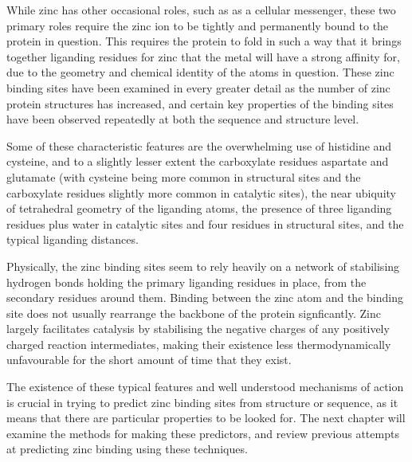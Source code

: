 While zinc has other occasional roles, such as as a cellular messenger, these two primary roles require the zinc ion to be tightly and permanently bound to the protein in question. This requires the protein to fold in such a way that it brings together liganding residues for zinc that the metal will have a strong affinity for, due to the geometry and chemical identity of the atoms in question. These zinc binding sites have been examined in every greater detail as the number of zinc protein structures has increased, and certain key properties of the binding sites have been observed repeatedly at both the sequence and structure level.

Some of these characteristic features are the overwhelming use of histidine and cysteine, and to a slightly lesser extent the carboxylate residues aspartate and glutamate (with cysteine being more common in structural sites and the carboxylate residues slightly more common in catalytic sites), the near ubiquity of tetrahedral geometry of the liganding atoms, the presence of three liganding residues plus water in catalytic sites and four residues in structural sites, and the typical liganding distances.

Physically, the zinc binding sites seem to rely heavily on a network of stabilising hydrogen bonds holding the primary liganding residues in place, from the secondary residues around them. Binding between the zinc atom and the binding site does not usually rearrange the backbone of the protein signficantly. Zinc largely facilitates catalysis by stabilising the negative charges of any positively charged reaction intermediates, making their existence less thermodynamically unfavourable for the short amount of time that they exist.

The existence of these typical features and well understood mechanisms of action is crucial in trying to predict zinc binding sites from structure or sequence, as it means that there are particular properties to be looked for. The next chapter will examine the methods for making these predictors, and review previous attempts at predicting zinc binding using these techniques.


